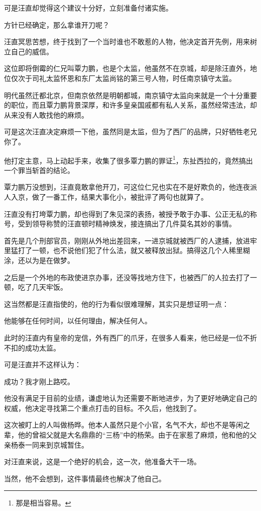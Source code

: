 \begin{multicols}{\theparacolNo}
可是汪直却觉得这个建议十分好，立刻准备付诸实施。

方针已经确定，那么拿谁开刀呢？

汪直冥思苦想，终于找到了一个当时谁也不敢惹的人物，他决定首开先例，用来树立自己的威信。

这位即将倒霉的仁兄叫覃力鹏，也是个太监，他虽然不在京城，却是除汪直外，地位仅次于司礼太监怀恩和东厂太监尚铭的第三号人物，时任南京镇守太监。

明代虽然迁都北京，但南京依然是明朝都城，南京镇守太监向来就是一个十分重要的职位，而且覃力鹏背景深厚，和许多皇亲国戚都有私人关系，虽然经常违法，却从来没有人敢找他的麻烦。

可是这次汪直决定麻烦一下他，虽然同是太监，但为了西厂的品牌，只好牺牲老兄你了。

他打定主意，马上动起手来，收集了很多覃力鹏的罪证\footnote{那是相当容易。}，东扯西拉的，竟然搞出一个罪当斩首的结论。

覃力鹏万没想到，汪直竟敢拿他开刀，可这位仁兄也实在不是好欺负的，他连夜派人入京，做了一番工作，结果大事化小，被批评了两句也就算了。

汪直没有打垮覃力鹏，却也得到了朱见深的表扬，被授予敢于办事、公正无私的称号，受到领导称赞的汪直顿时精神焕发，接连搞出了几件莫名其妙的事情。

首先是几个刑部官员，刚刚从外地出差回来，一进京城就被西厂的人逮捕，放进牢里猛打了一顿，也不说他们犯了什么法，就又被释放出狱。搞得这几个人稀里糊涂，还以为是在做梦。

之后是一个外地的布政使进京办事，还没等找地方住下，也被西厂的人拉去打了一顿，吃了几天牢饭。

这当然都是汪直指使的，他的行为看似很难理解，其实只是想证明一点：

他能够在任何时间，以任何理由，解决任何人。

此时的汪直内有皇帝的宠信，外有西厂的爪牙，在很多人看来，他已经是一位不折不扣的成功太监。

可是汪直并不这样认为：

成功？我才刚上路哎。

他没有满足于目前的业绩，谦虚地认为还需要不断地进步，为了更好地确定自己的权威，他决定寻找第二个重点打击的目标。不久后，他找到了。

这次被盯上的人叫做杨晔。他本人虽然只是个小官，名气不大，却也不是等闲之辈，他的曾祖父就是大名鼎鼎的“三杨”中的杨荣。由于在家惹了麻烦，他和他的父亲杨泰一同来到京城暂住。

对汪直来说，这是一个绝好的机会，这一次，他准备大干一场。

当然，他不会想到，这件事情最终也解决了他自己。


\end{multicols}

